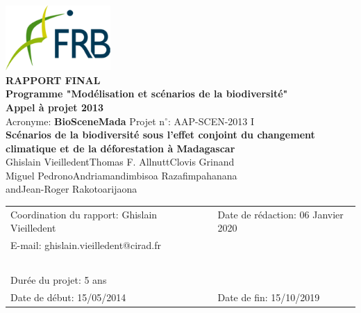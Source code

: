 \renewcommand{\bibsection}{}
\begin{center}
\includegraphics[width=4cm]{figures/FRB.png}\\
\vspace{1cm}
{\large
  \textbf{
    RAPPORT FINAL\\
    Programme "Modélisation et scénarios de la biodiversité"\\
    Appel à projet 2013\\
  }
}
\vspace{1cm}
Acronyme: \textbf{BioSceneMada} \hspace{2cm} Projet n$^{\circ}$: AAP-SCEN-2013 I\\
\vspace{1cm}
{\Large \textbf{Scénarios de la biodiversité sous l'effet conjoint du changement climatique et de la déforestation à Madagascar}}\\
\vspace{1cm}
{\large 
  Ghislain Vieilledent\hspace{1cm}Thomas F. Allnutt\hspace{1cm}Clovis Grinand\\
  \vspace{0.25cm}
  Miguel Pedrono\hspace{1cm}Andriamandimbisoa Razafimpahanana\\
  \vspace{0.25cm}
  and\hspace{1cm}Jean-Roger Rakotoarijaona\\
}
\vspace{1cm}
\begin{tabular}{lcl}
Coordination du rapport: Ghislain Vieilledent & \hspace{1cm} & Date de rédaction: 06 Janvier 2020\\
E-mail: ghislain.vieilledent@cirad.fr & \hspace{1cm} & ~ \\ 
~ & ~ \\
Durée du projet: 5 ans & \hspace{1cm} & ~ \\  
Date de début: 15/05/2014 & \hspace{1cm} & Date de fin: 15/10/2019\\
\end{tabular}
\end{center}
\newpage
